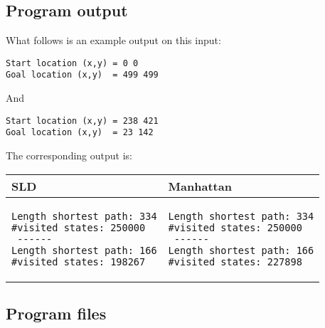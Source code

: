 \documentclass{article}
\begin{document}
\subsection*{Program output}
What follows is an example output on this input:
\begin{verbatim}
Start location (x,y) = 0 0
Goal location (x,y)  = 499 499
\end{verbatim}
And
\begin{verbatim}
Start location (x,y) = 238 421
Goal location (x,y)  = 23 142
\end{verbatim}
The corresponding output is:\\
\begin{tabular}{m{5cm}|m{5cm}}
SLD & Manhattan\\\hline
\begin{verbatim}
Length shortest path: 334
#visited states: 250000
 ------
Length shortest path: 166
#visited states: 198267
\end{verbatim}
&
\begin{verbatim}
Length shortest path: 334
#visited states: 250000
 ------
Length shortest path: 166
#visited states: 227898
\end{verbatim}
\end{tabular}

\subsection*{Program files}
\end{document}
